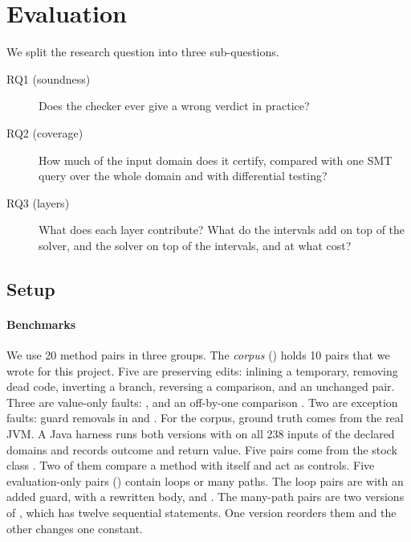 \section{Evaluation}
\label{sec:evaluation}

We split the research question into three sub-questions.
\begin{description}
  \item[RQ1 (soundness)] Does the checker ever give a wrong verdict in practice?
  \item[RQ2 (coverage)] How much of the input domain does it certify, compared with one SMT
        query over the whole domain and with differential testing?
  \item[RQ3 (layers)] What does each layer contribute? What do the intervals add on top of
        the solver, and the solver on top of the intervals, and at what cost?
\end{description}

\subsection{Setup}
\label{sec:setup}

\paragraph{Benchmarks}
We use 20 method pairs in three groups. The \emph{corpus} () holds 10
pairs that we wrote for this project. Five are preserving edits: inlining a temporary,
removing dead code, inverting a branch, reversing a  comparison, and an unchanged
pair. Three are value-only faults: ,  and an off-by-one comparison
. Two are exception faults: guard removals in  and
. For the corpus, ground truth comes from the real JVM. A Java harness runs
both versions with  on all 238 inputs of the declared domains and records outcome
and return value. Five pairs
come from the stock \jpamb{} class . Two of them compare a method with itself and
act as controls. Five evaluation-only pairs () contain loops or many
paths. The loop pairs are  with an added guard,  with a rewritten
body, and . The many-path pairs are two versions of , which has
twelve sequential  statements. One version reorders them and the other changes one
constant.

